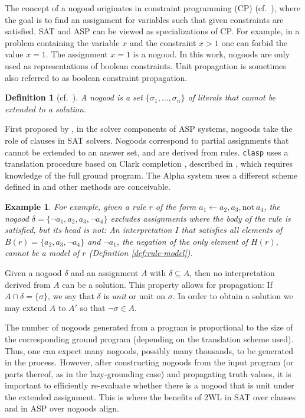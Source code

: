 \documentclass{vutinfth} %
\newtheorem{example}{Example}[section]
\newtheorem{definition}{Definition}[section]
\newcommand{\ass}{A}
\newcommand{\headf}{H}
\newcommand{\bodyf}{B}
\newcommand{\fail}{\mathrm{not } \ \xspace}
\newcommand{\from}{\ensuremath{\leftarrow}}
\newcommand{\bsgl}{\sigma}
\newcommand{\clasp}{\texttt{clasp}\xspace}
\begin{document}
The concept of a nogood originates in constraint programming (CP) (cf.~\cite{clasp,handbook-cp,handbook-kr-cp}), where the goal is to find an assignment for variables such that given constraints are satisfied. SAT and ASP can be viewed as specializations of CP. For example, in a problem containing the variable $x$ and the constraint $x > 1$ one can forbid the value $x = 1$. The assignment $x = 1$ is a nogood. In this work, nogoods are only used as representations of boolean constraints. Unit propagation is sometimes also referred to as boolean constraint propagation.

\begin{definition}[cf.~\cite{handbook-cp}]
\label{def:nogood}
A \emph{nogood} is a set $\{ \bsgl_1, \ldots, \bsgl_n \}$ of literals that cannot be extended to a solution.
\end{definition}

First proposed by \citet{clasp-first}, in the solver components of ASP systems, nogoods take the role of clauses in SAT solvers. Nogoods correspond to partial assignments that cannot be extended to an answer set, and are derived from rules. \clasp uses a translation procedure based on Clark completion \cite{clark}, described in \cite[Section 3]{clasp}, which requires knowledge of the full ground program. The Alpha system uses a different scheme defined in \cite[Definition 5]{blend} and other methods are conceivable.

\begin{example}
\label{ex:rule-to-nogood}
For example, given a rule $r$ of the form $a_1 \from a_2, a_3, \fail a_4$, the nogood $\delta = \{\neg a_1, a_2, a_3, \neg a_4 \}$ excludes assignments where the body of the rule is satisfied, but its head is not: An interpretation $I$ that satisfies all elements of $\bodyf(r) = \{a_2, a_3, \neg a_4 \}$ and $\neg a_1$, the negation of the only element of $\headf(r)$, cannot be a model of $r$ (Definition \ref{def:rule-model}).
\end{example}

Given a nogood $\delta$ and an assignment $\ass$ with $\delta \subseteq \ass$, then no interpretation derived from $\ass$ can be a solution. This property allows for propagation: If $\ass \cap \delta = \{ \bsgl \}$, we say that $\delta$ is \emph{unit} or unit on $\bsgl$. In order to obtain a solution we may extend $\ass$ to $\ass'$ so that $\neg \bsgl \in \ass$.

The number of nogoods generated from a program is proportional to the size of the corresponding ground program (depending on the translation scheme used). Thus, one can expect many nogoods, possibly many thousands, to be generated in the process. However, after constructing nogoods from the input program (or parts thereof, as in the lazy-grounding case) and propagating truth values, it is important to efficiently re-evaluate whether there is a nogood that is unit under the extended assignment. This is where the benefits of 2WL in SAT over clauses and in ASP over nogoods align.
\end{document}
